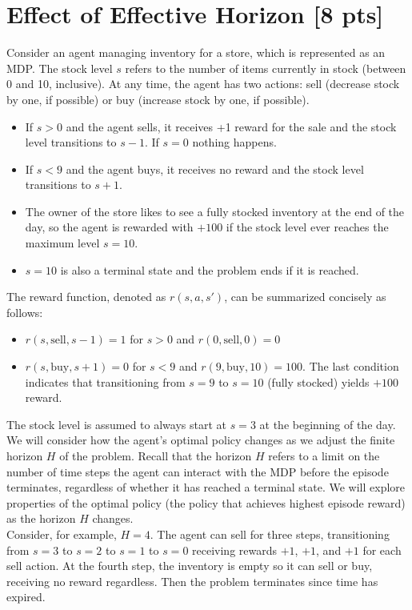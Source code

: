 
\section{Effect of Effective Horizon [8 pts]} 

Consider an agent managing inventory for a store, which is represented as an MDP. The stock level $s$ refers to the number of items currently in stock (between 0 and 10, inclusive). At any time, the agent has two actions: sell (decrease stock by one, if possible) or buy (increase stock by one, if possible).  
\begin{itemize}
\item If $s 
 > 0$ and the agent sells, it receives +1 reward for the sale and the stock level transitions to $s - 1$. If $s = 0$ nothing happens.
 \item If $s < 9$ and the agent buys, it receives no reward and the stock level transitions to $s +  1$.
 \item The owner of the store likes to see a fully stocked inventory at the end of the day, so the agent is rewarded with $+100$ if the stock level ever reaches the maximum level $s = 10$.
 \item $s = 10$ is also a terminal state and the problem ends if it is reached.
\end{itemize}

The reward function, denoted as $r(s, a, s')$, can be summarized concisely as follows:
\begin{itemize}
    \item $r(s,\text{sell}, s-1) = 1$ for $s > 0$ and $r(0,\text{sell},0) = 0$
    \item $r(s, \text{buy}, s+1) = 0$ for $s < 9$ and $r(9, \text{buy}, 10) = 100$. The last condition indicates that transitioning from $s = 9$ to $s = 10$ (fully stocked) yields $+100$ reward.
\end{itemize}

\noindent The stock level is assumed to always start at $s = 3$ at the beginning of the day. We will consider how the agent's optimal policy changes as we adjust the finite horizon $H$ of the problem. Recall that the horizon $H$ refers to a limit on the number of time steps the agent can interact with the MDP before the episode terminates, regardless of whether it has reached a terminal state. We will explore properties of the optimal policy (the policy that achieves highest episode reward) as the horizon $H$ changes.\\

\noindent Consider, for example, $H = 4$. The agent can sell for three steps, transitioning from $s = 3$ to $s = 2$ to $s = 1$ to $s = 0$ receiving rewards $+1$, $+1$, and $+1$ for each sell action. At the fourth step, the inventory is empty so it can sell or buy, receiving no reward regardless. Then the problem terminates since time has expired.

